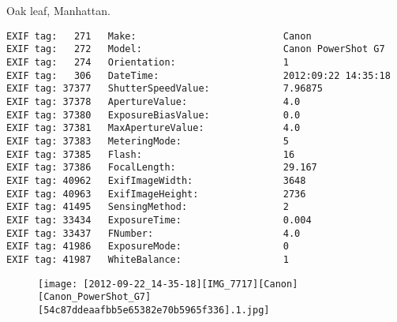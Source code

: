\section{\protect{}}
\noindent Oak leaf, Manhattan.
\noindent
\begin{lstlisting}
EXIF tag:   271   Make:                          Canon
EXIF tag:   272   Model:                         Canon PowerShot G7
EXIF tag:   274   Orientation:                   1
EXIF tag:   306   DateTime:                      2012:09:22 14:35:18
EXIF tag: 37377   ShutterSpeedValue:             7.96875
EXIF tag: 37378   ApertureValue:                 4.0
EXIF tag: 37380   ExposureBiasValue:             0.0
EXIF tag: 37381   MaxApertureValue:              4.0
EXIF tag: 37383   MeteringMode:                  5
EXIF tag: 37385   Flash:                         16
EXIF tag: 37386   FocalLength:                   29.167
EXIF tag: 40962   ExifImageWidth:                3648
EXIF tag: 40963   ExifImageHeight:               2736
EXIF tag: 41495   SensingMethod:                 2
EXIF tag: 33434   ExposureTime:                  0.004
EXIF tag: 33437   FNumber:                       4.0
EXIF tag: 41986   ExposureMode:                  0
EXIF tag: 41987   WhiteBalance:                  1

\end{lstlisting}
\clearpage
\begin{figure}
\raggedleft
\texttt{[image: [2012-09-22\_14-35-18][IMG\_7717][Canon][Canon\_PowerShot\_G7][54c87ddeaafbb5e65382e70b5965f336].1.jpg]}
\end{figure}


\clearpage
